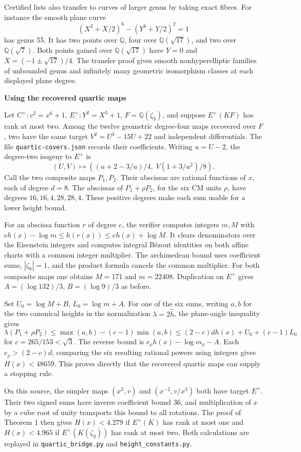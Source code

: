 \documentclass[12pt]{article}
\newcommand{\Q}{\mathbb Q}\newcommand{\Z}{\mathbb Z}\newcommand{\C}{C_6}
\newcommand{\heading}[1]{{\Large\bfseries\color{ink}#1}\par\smallskip}
\begin{document}
Certified lists also transfer to curves of larger genus by taking exact fibres. For instance the smooth plane curve
\[
       (X^2+X/2)^6-(Y^6+Y/2)^2=1
\]
has genus 55. It has two points over $\Q$, four over $\Q(\sqrt{17})$, and two over $\Q(\sqrt7)$. Both points gained over $\Q(\sqrt{17})$ have $Y=0$ and $X=(-1\pm\sqrt{17})/4$. The transfer proof gives smooth nonhyperelliptic families of unbounded genus and infinitely many geometric isomorphism classes at each displayed plane degree.

\newpage
\heading{Using the recovered quartic maps}
Let $C^+:v^2=x^6+1$, $E^+:Y^2=X^3+1$, $F=\Q(\zeta_3)$, and suppose $E^+(KF)$ has rank at most two. Among the twelve geometric degree-four maps recovered over $F$, two have the same target $V^2=U^3-15U+22$ and independent differentials. The file \texttt{quartic-covers.json} records their coefficients. Writing $u=U-2$, the degree-two isogeny to $E^+$ is
\[
    (U,V)\longmapsto\left((u+2-3/u)/4,\;V(1+3/u^2)/8\right).
\]
Call the two composite maps $P_1,P_2$. Their abscissas are rational functions of $x$, each of degree $d=8$. The abscissas of $P_1+\rho P_2$, for the six CM units $\rho$, have degrees $16,16,4,28,28,4$. These positive degrees make each sum usable for a lower height bound.

For an abscissa function $r$ of degree $e$, the verifier computes integers $m,M$ with $eh(x)-\log m\le h(r(x))\le eh(x)+\log M$. It clears denominators over the Eisenstein integers and computes integral B\'ezout identities on both affine charts with a common integer multiplier. The archimedean bound uses coefficient sums, $|\zeta_6|=1$, and the product formula cancels the common multiplier. For both composite maps one obtains $M=171$ and $m=22408$. Duplication on $E^+$ gives $A=(\log132)/3$, $B=(\log9)/3$ as before.

Set $U_0=\log M+B$, $L_0=\log m+A$. For one of the six sums, writing $a,b$ for the two canonical heights in the normalization $\lambda=2\widehat h$, the plane-angle inequality gives
\[
  \lambda(P_1+\rho P_2)\le \max(a,b)-(c-1)\min(a,b)
  \le(2-c)dh(x)+U_0+(c-1)L_0
\]
for $c=265/153<\sqrt3$. The reverse bound is $e_\rho h(x)-\log m_\rho-A$. Each $e_\rho>(2-c)d$; comparing the six resulting rational powers using integers gives $H(x)<48659$. This proves directly that the recovered quartic maps can supply a stopping rule.

On this source, the simpler maps $(x^2,v)$ and $(x^{-2},v/x^3)$ both have target $E^+$. Their two signed sums have inverse coefficient bound 36, and multiplication of $x$ by a cube root of unity transports this bound to all rotations. The proof of Theorem 1 then gives $H(x)<4.279$ if $E^+(K)$ has rank at most one and $H(x)<4.965$ if $E^+(K(\zeta_3))$ has rank at most two. Both calculations are replayed in \texttt{quartic\_bridge.py} and \texttt{height\_constants.py}.
\end{document}

